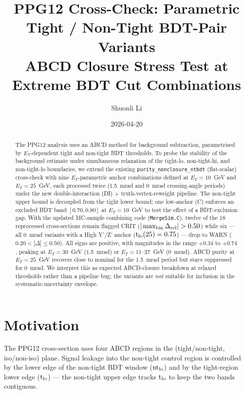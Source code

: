 \documentclass[11pt]{article}
\title{PPG12 Cross-Check: Parametric Tight / Non-Tight BDT-Pair Variants\\
       \large ABCD Closure Stress Test at Extreme BDT Cut Combinations}
\author{Shuonli Li}
\date{2026-04-20}
\begin{document}
\maketitle

\begin{abstract}
The PPG12 analysis uses an ABCD method for background subtraction, parametrised
by $E_T$-dependent tight and non-tight BDT thresholds. To probe the stability
of the background estimate under simultaneous relaxation of the
tight-lo, non-tight-hi, and non-tight-lo boundaries, we extend the
existing \texttt{purity\_nonclosure\_ntbdt} (flat-scalar) cross-check
with nine $E_T$-parametric anchor combinations defined at $E_T = 10$~GeV
and $E_T = 25$~GeV, each processed twice (1.5~mrad and 0~mrad
crossing-angle periods) under the new double-interaction (DI) +
truth-vertex-reweight pipeline. The non-tight upper bound is decoupled
from the tight lower bound; one low-anchor (C) enforces an excluded BDT
band $[0.70, 0.80]$ at $E_T = 10$~GeV to test the effect of a
BDT-exclusion gap. With the updated MC-sample combining code
(\texttt{MergeSim.C}), twelve of the 18 reprocessed cross-sections
remain flagged \textsc{CRIT} ($|\max_{\rm bin}\Delta_{\rm rel}| > 0.50$)
while six — all 0~mrad variants with a High Y'/Z' anchor
($\mathrm{t}_{\rm lo}(25) = 0.75$) — drop to \textsc{WARN}
($0.20 < |\Delta| \le 0.50$). All signs are positive, with magnitudes
in the range $+0.34$ to $+0.74$, peaking at $E_T = 30$~GeV (1.5~mrad)
or $E_T = 11$--$27$~GeV (0~mrad). ABCD purity at $E_T = 25$~GeV
recovers close to nominal for the 1.5~mrad period but stays suppressed
for 0~mrad. We interpret this as expected ABCD-closure breakdown at
relaxed thresholds rather than a pipeline bug; the variants are
\emph{not} suitable for inclusion in the systematic-uncertainty
envelope.
\end{abstract}

\section{Motivation}

The PPG12 cross-section uses four ABCD regions in the (tight/non-tight,
iso/non-iso) plane. Signal leakage into the non-tight control region is
controlled by the lower edge of the non-tight BDT window
($\mathrm{nt}_{\rm lo}$) and by the tight-region lower edge
($\mathrm{t}_{\rm lo}$) — the non-tight upper edge tracks $\mathrm{t}_{\rm lo}$
to keep the two bands contiguous.
\end{document}
